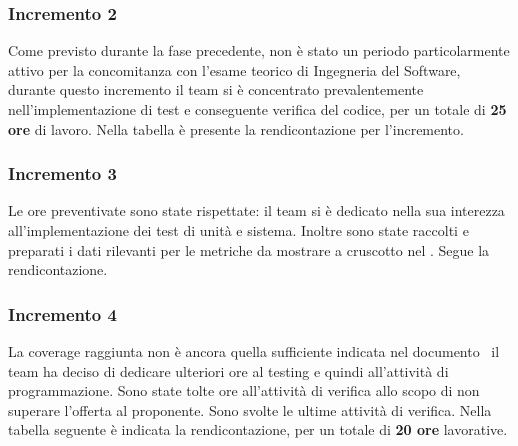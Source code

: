     \subsubsection{Incremento 2}
        Come previsto durante la fase precedente, non è stato un periodo particolarmente attivo per la concomitanza con l'esame teorico di Ingegneria del Software, durante questo incremento il team si è concentrato prevalentemente nell'implementazione di test e conseguente verifica del codice, per un totale di \textbf{25 ore} di lavoro. Nella tabella è presente la rendicontazione per l'incremento.
        \def\salarycontent{
            {Amministratore,4,20,80},
            {Analista,      0,25,0},
            {Progettista,   5,22,110},
            {Programmatore, 11,15,165},
            {Responsabile,  3,30,90},
            {Verificatore,  2,15,30},
            {Totale,        25,127,475},
        }
        
    \subsubsection{Incremento 3}
        Le ore preventivate sono state rispettate: il team si è dedicato nella sua interezza all'implementazione dei test di unità e sistema. Inoltre sono state raccolti e preparati i dati rilevanti per le metriche da mostrare a cruscotto nel \PdQ . Segue la rendicontazione.
        \def\salarycontent{
            {Amministratore,4,20,80},
            {Analista,      0,25,0},
            {Progettista,   10,22,220},
            {Programmatore, 31,15,475},
            {Responsabile,  5,30,150},
            {Verificatore,  20,15,300},
            {Totale,        70,127,1215},
        }
        
    \subsubsection{Incremento 4}
        La coverage raggiunta non è ancora quella sufficiente indicata nel documento \PdQ\ il team ha deciso di dedicare ulteriori ore al testing e quindi all'attività di programmazione. Sono state tolte ore all'attività di verifica allo scopo di non superare l'offerta al proponente. Sono svolte le ultime attività di verifica. Nella tabella seguente è indicata la rendicontazione, per un totale di \textbf{20 ore} lavorative.
        \def\salarycontent{
            {Amministratore,4,20,80},
            {Analista,      0,25,0},
            {Progettista,   0,22,0},
            {Programmatore, 12,15,180},
            {Responsabile,  4,30,120},
            {Verificatore,  8,15,120},
            {Totale,        28,127,500},
        }
        
